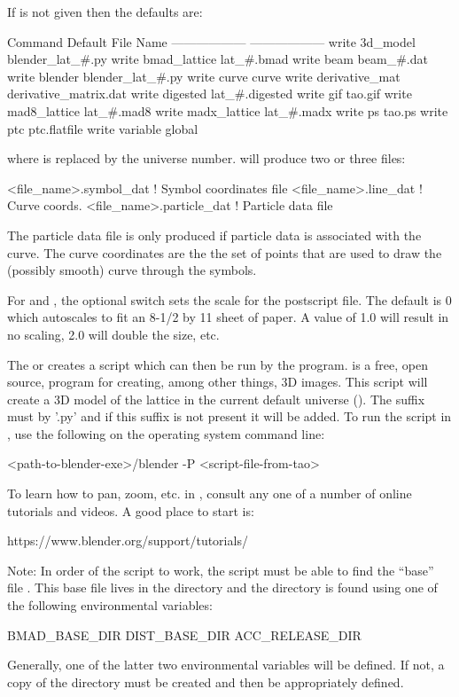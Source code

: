 {{{{{{If  is not given then the defaults are:
\begin{example}
  Command                        Default File Name
  ------------------             ------------------
  write 3d_model                 blender_lat_#.py
  write bmad_lattice             lat_#.bmad
  write beam                     beam_#.dat
  write blender                  blender_lat_#.py
  write curve                    curve
  write derivative_mat           derivative_matrix.dat              
  write digested                 lat_#.digested
  write gif                      tao.gif
  write mad8_lattice             lat_#.mad8
  write madx_lattice             lat_#.madx
  write ps                       tao.ps
  write ptc                      ptc.flatfile
  write variable                 global%
\end{example}
where \vn{\#} is replaced by the universe number.  will produce two or
three files:
\begin{example}
  <file_name>.symbol_dat    ! Symbol coordinates file
  <file_name>.line_dat      ! Curve coords.
  <file_name>.particle_dat  ! Particle data file
\end{example}
The particle data file is only produced if particle data is associated with the curve.
The curve coordinates are the the set of points that are used to draw the (possibly
smooth) curve through the symbols.

For  and , the optional  switch sets the scale for the
postscript file. The default is 0 which autoscales to fit an 8-1/2 by 11 sheet of paper. A
value of 1.0 will result in no scaling, 2.0 will double the size, etc.

The  or  creates a script which can then be run by
the  program\cite{b:blender}.   is a free, open source, program
for creating, among other things, 3D images. This script will create a 3D model of the
lattice in the current default universe (). The suffix must by '.py' and
if this suffix is not present it will be added. To run the script in , use the
following on the operating system command line:
\begin{example}
  <path-to-blender-exe>/blender -P <script-file-from-tao>
\end{example}
To learn how to pan, zoom, etc. in , consult any one of a number of online
tutorials and videos. A good place to start is:
\begin{example}
  https://www.blender.org/support/tutorials/  
\end{example}
Note: In order of the script to work, the script must be able to find the ``base'' file
. This base file lives in the  directory and the
 directory is found using one of the following environmental variables:
\begin{example}
  BMAD_BASE_DIR
  DIST_BASE_DIR
  ACC_RELEASE_DIR
\end{example}
Generally, one of the latter two environmental variables will be defined.  If not, a copy
of the \bmad directory must be created and then  be appropriately
defined.

}}}}}}
